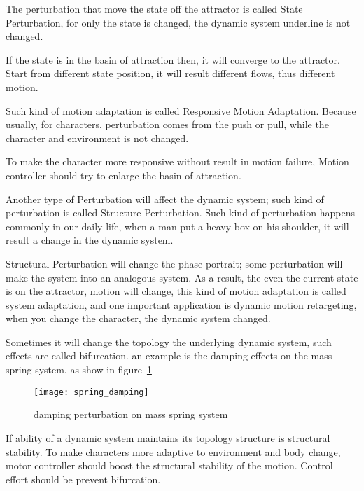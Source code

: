 \begin{itemize}

The perturbation that move the state off the attractor is called State Perturbation, for only the state is changed, the dynamic system underline is not changed.


If the state is in the basin of attraction then, it will converge to the attractor. 
Start from different state position, it will result different flows, thus different motion.

Such kind of motion adaptation is called Responsive Motion Adaptation.
Because usually, for characters, perturbation comes from the push or pull, while the character and environment is not changed.

To make the character more responsive without result in motion failure,
Motion controller should try to enlarge the basin of attraction.







Another type of Perturbation will affect the dynamic system; such kind of perturbation is called Structure Perturbation. 
Such kind of perturbation happens commonly in our daily life, when a man put a heavy box on his shoulder, it will result a change in the dynamic system.

Structural Perturbation will change the phase portrait; some perturbation will make the system into an analogous system.
As a result, the even the current state is on the attractor, motion will change, this kind of motion adaptation is called system adaptation, and one important application is dynamic motion retargeting, when you change the character, the dynamic system changed.

Sometimes it will change the topology the underlying dynamic system, such effects are called bifurcation.
an example is the damping effects on the mass spring system.
as show in figure~\ref{fig:dampmass}

\begin{figure}
\begin{center}
\texttt{[image: spring\_damping]}
\end{center}
\caption{damping perturbation on mass spring system}
\label{fig:dampmass}
\end{figure}

If ability of a dynamic system maintains its topology structure is structural stability.
To make characters more adaptive to environment and body change, motor controller should boost the structural stability of the motion.
Control effort should be prevent bifurcation.
\end{itemize}


